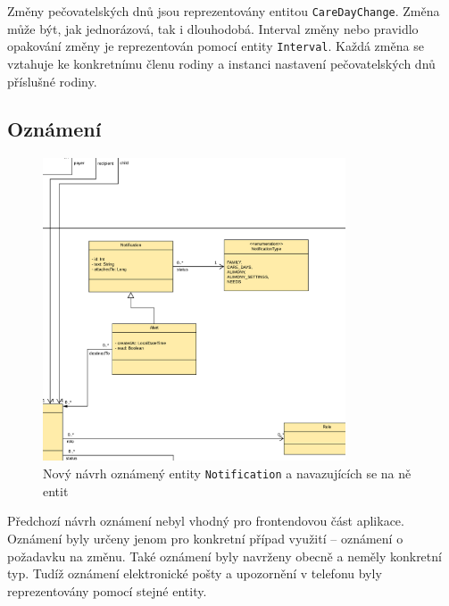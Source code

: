         Změny pečovatelských dnů jsou reprezentovány entitou \verb|CareDayChange|. Změna může být, jak jednorázová, tak i dlouhodobá. Interval změny nebo pravidlo opakování změny je reprezentován pomocí entity \verb|Interval|. Každá změna se vztahuje ke konkretnímu členu rodiny a instanci nastavení pečovatelských dnů příslušné rodiny.
        
    \subsection{Oznámení}\label{navrh:upravy:notification}
        \begin{figure}\centering
	       \includegraphics[width=0.8\textwidth]{pdfs/Notification2}
	       \caption[Nový návrh oznámení]{Nový návrh oznámený entity \texttt{Notification} a navazujících se na ně entit}\label{image:notification2}
        \end{figure}
        Předchozí návrh oznámení nebyl vhodný pro frontendovou část aplikace. Oznámení byly určeny jenom pro konkretní případ využití -- oznámení o požadavku na změnu. Také oznámení byly navrženy obecně a neměly konkretní typ. Tudíž oznámení elektronické pošty a upozornění v telefonu byly reprezentovány pomocí stejné entity.
        
